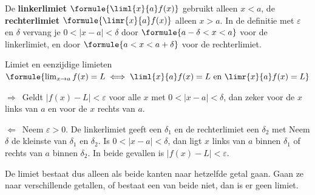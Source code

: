 \begin{theorie}
De \textbf{\textcolor{accent}{linkerlimiet}} $\formule{\liml{x}{a} f(x)}$ gebruikt alleen $x < a$, de \textbf{\textcolor{accent}{rechterlimiet}} $\formule{\limr{x}{a} f(x)}$ alleen $x > a$. In de definitie met $\varepsilon$ en $\delta$ vervang je $0 < |x - a| < \delta$ door $\formule{a - \delta < x < a}$ voor de linkerlimiet, en door $\formule{a < x < a + \delta}$ voor de rechterlimiet.

\begin{stelling}{Limiet en eenzijdige limieten}
$\formule{\lim_{x \to a} f(x) = L \iff \liml{x}{a} f(x) = L \text{ en } \limr{x}{a} f(x) = L}$
\end{stelling}
\begin{bewijs}
$\Rightarrow$\ Geldt $|f(x) - L| < \varepsilon$ voor alle $x$ met $0 < |x - a| < \delta$, dan zeker voor de $x$ links van $a$ en voor de $x$ rechts van $a$.

$\Leftarrow$\ Neem $\varepsilon > 0$. De linkerlimiet geeft een $\delta_1$ en de rechterlimiet een $\delta_2$ met
Neem $\delta$ de kleinste van $\delta_1$ en $\delta_2$. Is $0 < |x - a| < \delta$, dan ligt $x$ links van $a$ binnen $\delta_1$ of rechts van $a$ binnen $\delta_2$. In beide gevallen is $|f(x) - L| < \varepsilon$.
\end{bewijs}
\end{theorie}

De limiet bestaat dus alleen als beide kanten naar hetzelfde getal gaan. Gaan ze naar verschillende getallen, of bestaat een van beide niet, dan is er geen limiet.


